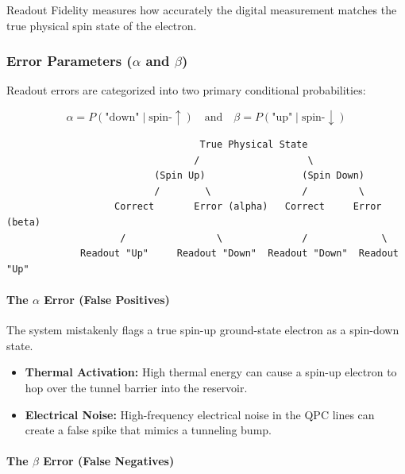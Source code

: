 \documentclass[
]{article}
\providecommand{\tightlist}{%
  \setlength{\itemsep}{0pt}\setlength{\parskip}{0pt}}
\begin{document}
Readout Fidelity measures how accurately the digital measurement matches
the true physical spin state of the electron.

\subsubsection{\texorpdfstring{Error Parameters (\(\alpha\) and
\(\beta\))}{Error Parameters (\textbackslash alpha and \textbackslash beta)}}\label{error-parameters-alpha-and-beta}

Readout errors are categorized into two primary conditional
probabilities:

\[\alpha = P(\text{"down"} \mid \text{spin-}\uparrow) \quad \text{and} \quad \beta = P(\text{"up"} \mid \text{spin-}\downarrow)\]

\begin{verbatim}
                                  True Physical State
                                 /                   \
                          (Spin Up)                 (Spin Down)
                          /        \                /         \
                   Correct       Error (alpha)   Correct     Error (beta)
                    /                \              /             \
             Readout "Up"     Readout "Down"  Readout "Down"  Readout "Up"
\end{verbatim}

\paragraph{\texorpdfstring{The \(\alpha\) Error (False
Positives)}{The \textbackslash alpha Error (False Positives)}}\label{the-alpha-error-false-positives}

The system mistakenly flags a true spin-up ground-state electron as a
spin-down state.

\begin{itemize}
\tightlist
\item
  \textbf{Thermal Activation:} High thermal energy can cause a spin-up
  electron to hop over the tunnel barrier into the reservoir.
\item
  \textbf{Electrical Noise:} High-frequency electrical noise in the QPC
  lines can create a false spike that mimics a tunneling bump.
\end{itemize}

\paragraph{\texorpdfstring{The \(\beta\) Error (False
Negatives)}{The \textbackslash beta Error (False Negatives)}}\label{the-beta-error-false-negatives}
\end{document}
